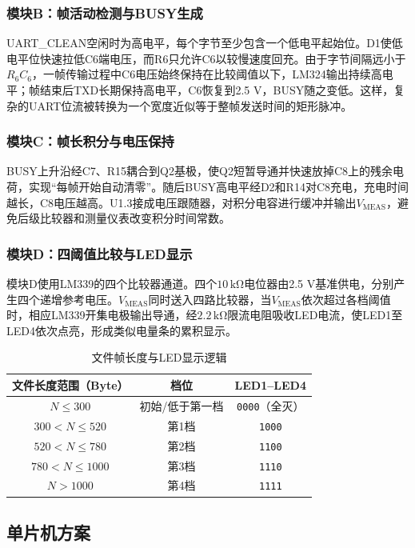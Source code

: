 \documentclass[a4paper]{article}
\newcommand{\unit}[1]{\ensuremath{\,\mathrm{#1}}}
\newcommand{\VMEAS}{V_{\mathrm{MEAS}}}
\newcommand{\ledstate}[1]{\texttt{#1}}
\begin{document}
\subsubsection{模块B：帧活动检测与BUSY生成}
UART\_CLEAN空闲时为高电平，每个字节至少包含一个低电平起始位。D1使低电平位快速拉低C6端电压，而R6只允许C6以较慢速度回充。由于字节间隔远小于$R_6C_6$，一帧传输过程中C6电压始终保持在比较阈值以下，LM324输出持续高电平；帧结束后TXD长期保持高电平，C6恢复到2.5 V，BUSY随之变低。这样，复杂的UART位流被转换为一个宽度近似等于整帧发送时间的矩形脉冲。

\subsubsection{模块C：帧长积分与电压保持}
BUSY上升沿经C7、R15耦合到Q2基极，使Q2短暂导通并快速放掉C8上的残余电荷，实现“每帧开始自动清零”。随后BUSY高电平经D2和R14对C8充电，充电时间越长，C8电压越高。U1.3接成电压跟随器，对积分电容进行缓冲并输出$\VMEAS$，避免后级比较器和测量仪表改变积分时间常数。

\subsubsection{模块D：四阈值比较与LED显示}
模块D使用LM339的四个比较器通道。四个$10\unit{k\Omega}$电位器由2.5 V基准供电，分别产生四个递增参考电压。$\VMEAS$同时送入四路比较器，当$\VMEAS$依次超过各档阈值时，相应LM339开集电极输出导通，经$2.2\unit{k\Omega}$限流电阻吸收LED电流，使LED1至LED4依次点亮，形成类似电量条的累积显示。

\begin{table}[H]
\centering
\caption{文件帧长度与LED显示逻辑}
\label{tab:level_logic}
\begin{tabular}{ccc}
\toprule
文件长度范围（Byte） & 档位 & LED1--LED4 \\
\midrule
$N\le 300$ & 初始/低于第一档 & \ledstate{0000}（全灭）\\
$300<N\le 520$ & 第1档 & \ledstate{1000}\\
$520<N\le 780$ & 第2档 & \ledstate{1100}\\
$780<N\le 1000$ & 第3档 & \ledstate{1110}\\
$N>1000$ & 第4档 & \ledstate{1111}\\
\bottomrule
\end{tabular}
\end{table}


\subsection{单片机方案}
\end{document}
